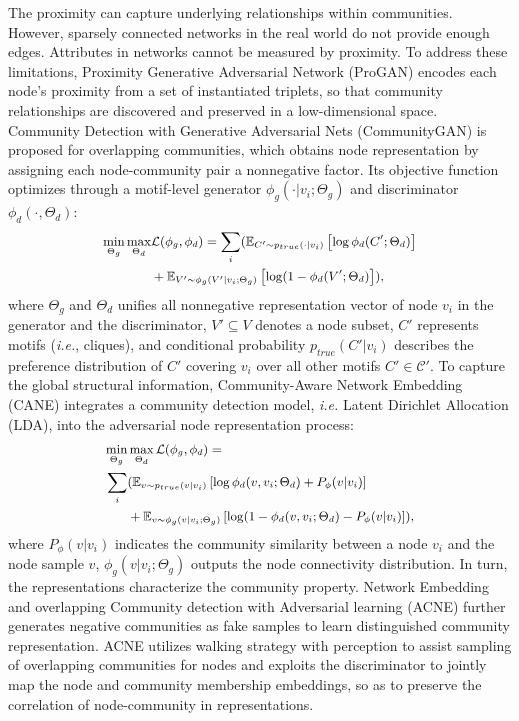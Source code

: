 The proximity can capture underlying relationships within communities. However, sparsely connected networks in the real world do not provide enough edges. Attributes in networks cannot be measured by proximity. To address these limitations, Proximity Generative Adversarial Network (ProGAN)  encodes each node's proximity from a set of instantiated triplets, so that community relationships are discovered and preserved in a low-dimensional space.
Community Detection with Generative Adversarial Nets (CommunityGAN)  is proposed for overlapping communities, which obtains node representation by assigning each node-community pair a nonnegative factor. Its objective function optimizes through a motif-level generator $\phi_g(\cdot|v_i;\Theta_g)$ and discriminator $\phi_d(\cdot,\Theta_d)$: 
\begin{equation}
\small
\begin{aligned}
\min_{\Theta_g} \max_{\Theta_d} & {\mathcal{L}(\phi_g, \phi_d)} =
\sum_i (\mathbb{E}_{C' \sim p_{true} (\cdot |v_{i})} \left[ \log \phi_d (C'; \Theta_d) \right] \\
& + \mathbb{E}_{V' \sim \phi_g(V' |v_i ; \Theta_g)} \left[ \log (1-\phi_d(V'; \Theta_d) \right] ), 
\end{aligned}
\end{equation}
where $\Theta_g$ and $\Theta_d$ unifies all nonnegative representation vector of node $v_i$ in the generator and the discriminator, $V'\subseteq V$ denotes a node subset, $C'$ represents motifs (\textit{i.e.}, cliques), and conditional probability $p_{true}(C'| v_i)$ describes the preference distribution of $C'$ covering $v_i$ over all other motifs $C'\in \mathcal{C'}$. 
To capture the global structural information, Community-Aware Network Embedding (CANE)  integrates a community detection model, \textit{i.e.} Latent Dirichlet Allocation (LDA), into the adversarial node representation process: 
\begin{equation}
\small
\begin{aligned}
\min_{\Theta_g} & \max_{\Theta_d}  {\mathcal{L}(\phi_g, \phi_d)} = \\
\sum_i & (\mathbb{E}_{v \sim p_{true} (v |v_{i})} \left[ \log \phi_{d} (v, v_{i}; \Theta_d) + P_{\phi}(v |v_{i}) \right] \\
& + \mathbb{E}_{v \sim \phi_{g}(v |v_{i} ; \Theta_g)} \left[ \log (1-\phi_{d}(v, v_{i}; \Theta_d) - P_{\phi}(v |v_{i}) \right] ), 
\end{aligned}
\end{equation}
where $P_{\phi}(v |v_{i})$ indicates the community similarity between a node $v_{i}$ and the node sample $v$, $\phi_{g}(v |v_{i} ; \Theta_g)$ outputs the node connectivity distribution. In turn, the representations characterize the community property.
Network Embedding and overlapping Community detection with Adversarial learning (ACNE)  further generates negative communities as fake samples to learn distinguished community representation. ACNE utilizes walking strategy with perception to assist sampling of overlapping communities for nodes and exploits the discriminator to jointly map the node and community membership embeddings, so as to preserve the correlation of node-community in representations.

